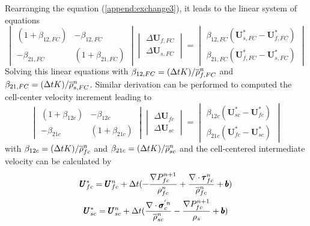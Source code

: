 \documentclass[preprint,12pt]{elsarticle}
\begin{document}
%
%
Rearranging the equation (\ref{append:exchange3}), it leads to the linear system of equations
%
\[ \begin{vmatrix} (1 + \beta_{12,FC})  &  -\beta_{12,FC} \\
                  -\beta_{21,FC}       &  (1 + \beta_{21,FC})
    \end{vmatrix}
    \begin{vmatrix} \Delta \pmb{U}_{f,FC} \\
                    \Delta \pmb{U}_{s,FC}
    \end{vmatrix}
    =
    \begin{vmatrix}  \beta_{12,FC}(\pmb{U}_{s,FC}^{*} - \pmb{U}_{f,FC}^{*}) \\
                    \beta_{21,FC}(\pmb{U}_{f,FC}^{*} - \pmb{U}_{s,FC}^{*})
    \end{vmatrix}                
\]
%
%
Solving this linear equations with $\beta_{12,FC} = (\Delta{t} K)/\overline{\rho}_{f,FC}^n$ and $\beta_{21,FC} = (\Delta{t} K)/\overline{\rho}_{s,FC}^n$. Similar derivation can be performed to computed the cell-center velocity increment leading to
%
\[ \begin{vmatrix} (1 + \beta_{12c})  &  -\beta_{12c} \\
                  -\beta_{21c}       &  (1 + \beta_{21c})
    \end{vmatrix}
    \begin{vmatrix} \Delta \pmb{U}_{fc} \\
                    \Delta \pmb{U}_{sc}
    \end{vmatrix}
    =
    \begin{vmatrix}  \beta_{12c}(\pmb{U}_{sc}^{*} - \pmb{U}_{fc}^{*}) \\
                    \beta_{21c}(\pmb{U}_{fc}^{*} - \pmb{U}_{sc}^{*})
    \end{vmatrix}                
\]
%
%
with $\beta_{12c} = (\Delta{t} K)/\overline{\rho}_{fc}^n$ and $\beta_{21c} = (\Delta{t} K)/\overline{\rho}_{sc}^n$ and the cell-centered intermediate velocity can be calculated by
%
\begin{equation}
\begin{gathered}
\pmb{U}_{fc}^{*} = \pmb{U}_{fc}^{n} + \Delta{t} (-\frac{\nabla P_{fc}^{n+1}}{\rho_{fc}^n}  + \frac {\nabla \cdot \pmb{\tau}_{fc}^{n}}{\overline{\rho}^n_{fc}} + \pmb{b}) \\
\pmb{U}_{sc}^{*} = \pmb{U}_{sc}^{n} + \Delta{t} (\frac{\nabla \cdot \pmb{\sigma}_c^{'n}}{\overline{\rho}^n_{sc}}    - \frac{\nabla P_{fc}^{n+1}}{\rho_s}  + \pmb{b})
\end{gathered}
\end{equation}
%
%
\end{document}
